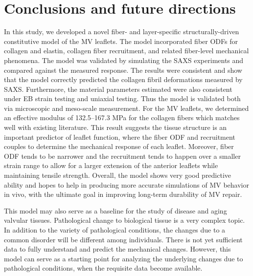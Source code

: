 \section{Conclusions and future directions}

In this study, we developed a novel fiber- and layer-specific structurally-driven constitutive model of the MV leaflets. The model incorporated fiber ODFs for collagen and elastin, collagen fiber recruitment, and related fiber-level mechanical phenomena. The model was validated by simulating the SAXS experiments and compared against the measured response. The results were consistent and show that the model correctly predicted the collagen fibril deformations measured by SAXS. Furthermore, the material parameters estimated were also consistent under EB strain testing and uniaxial testing. Thus the model is validated both via microscopic and meso-scale measurement. For the MV leaflets, we determined an effective modulus of 132.5–167.3 MPa for the collagen fibers which matches well with existing literature. This result suggests the tissue structure is an important predictor of leaflet function, where the fiber ODF and recruitment couples to determine the mechanical response of each leaflet. Moreover, fiber ODF tends to be narrower and the recruitment tends to happen over a smaller strain range to allow for a larger extension of the anterior leaflets while maintaining tensile strength. Overall, the model shows very good predictive ability and hopes to help in producing more accurate simulations of MV behavior in vivo, with the ultimate goal in improving long-term durability of MV repair.

This model may also serve as a baseline for the study of disease and aging valvular tissues. Pathological change to biological tissue is a very complex topic. In addition to the variety of pathological conditions, the changes due to a common disorder will be different among individuals. There is not yet sufficient data to fully understand and predict the mechanical changes. However, this model can serve as a starting point for analyzing the underlying changes due to pathological conditions, when the requisite data become available.

